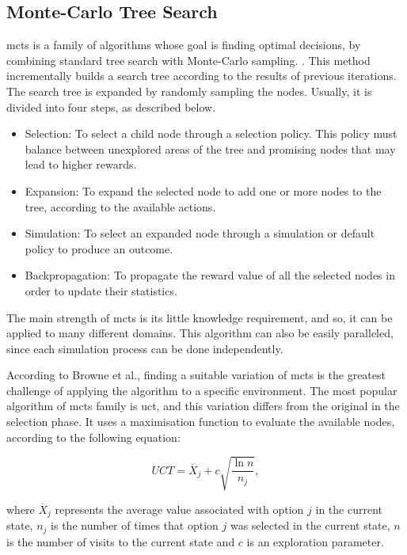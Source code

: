 \subsection{Monte-Carlo Tree Search}


\gls{mcts} is a family of algorithms whose goal is finding optimal decisions, by combining standard tree search with Monte-Carlo sampling. \cite{Browne2012}.
This method incrementally builds a search tree according to the results of previous iterations.
The search tree is expanded by randomly sampling the nodes.
Usually, it is divided into four steps, as described below.
\begin{itemize}
  \item Selection: To select a child node through a selection policy. This policy must balance between unexplored areas of the tree and promising nodes that may lead to higher rewards.
  \item Expansion: To expand the selected node to add one or more nodes to the tree, according to the available actions.
  \item Simulation: To select an expanded node through a simulation or default policy to produce an outcome.
  \item Backpropagation: To propagate the reward value of all the selected nodes in order to update their statistics.
\end{itemize}


The main strength of \gls{mcts} is its little knowledge requirement, and so, it can be applied to many different domains.
This algorithm can also be easily paralleled, since each simulation process can be done independently.


According to Browne et al., finding a suitable variation of \gls{mcts} is the greatest challenge of applying the algorithm to a specific environment.
The most popular algorithm of \gls{mcts} family is \gls{uct}, and this variation differs from the original in the selection phase.
It uses a maximisation function to evaluate the available nodes, according to the following equation:

\begin{equation}
    UCT = \overline{X}_j + c\sqrt{\frac{\ln n}{n_j}},
\end{equation}

where $\overline{X}_j$ represents the average value associated with option $j$ in the current state, $n_j$ is the number of times that option $j$ was selected in the current state, $n$ is the number of visits to the current state and $c$ is an exploration parameter.

